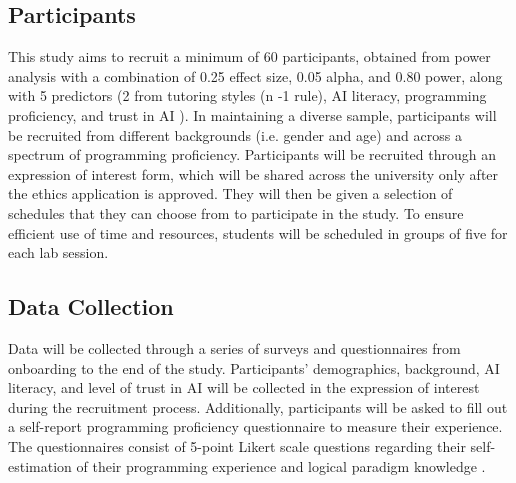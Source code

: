 \documentclass{article}
\begin{document}
\subsection{Participants}
This study aims to recruit a minimum of 60 participants, obtained from power analysis 
with a combination of 0.25 effect size, 0.05 alpha, and 0.80 power, along with 
5 predictors (2 from tutoring styles (n -1 rule), AI literacy, programming proficiency, and trust in AI ). In maintaining a diverse sample, participants will be recruited from 
different backgrounds (i.e. gender and age) and across a spectrum of programming proficiency. 
Participants will be recruited through an expression of interest 
form, which will be shared across the university only after the ethics application is approved. 
They will then be given a selection of schedules that they can choose from to participate in the study. 
To ensure efficient use of time and resources, students will be scheduled in 
groups of five for each lab session.

\subsection{Data Collection}
Data will be collected through a series of surveys and questionnaires from onboarding 
to the end of the study. Participants’ demographics, background, AI literacy, and level of 
trust in AI will be collected in the expression of interest during the recruitment process. 
Additionally, participants will be asked to fill out a self-report programming proficiency questionnaire 
to measure their experience. The questionnaires consist of 5-point Likert scale questions 
regarding their self-estimation of their programming experience and logical paradigm knowledge \cite{Feigenspan2012}.
\end{document}

